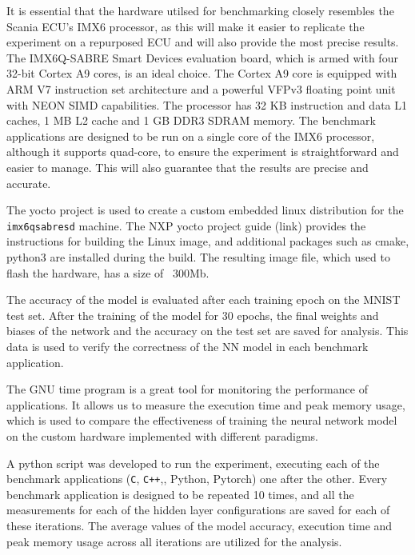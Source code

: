 It is essential that the hardware utilsed for benchmarking closely resembles the Scania ECU's IMX6 processor, as this will make it easier to replicate the experiment on a repurposed ECU and will also provide the most precise results. The IMX6Q-SABRE Smart Devices evaluation board, which is armed with four 32-bit Cortex A9 cores, is an ideal choice. The Cortex A9 core is equipped with ARM V7 instruction set architecture and a powerful VFPv3 floating point unit with NEON SIMD capabilities. The processor has 32 KB instruction and data L1 caches, 1 MB L2 cache and 1 GB DDR3 SDRAM memory. The benchmark applications are designed to be run on a single core of the IMX6 processor, although it supports quad-core, to ensure the experiment is straightforward and easier to manage. This will also guarantee that the results are precise and accurate.

The yocto project is used to create a custom embedded linux distribution for the \texttt{imx6qsabresd} machine. The NXP yocto project guide (link) provides the instructions for building the Linux image, and additional packages such as cmake, python3 are installed during the build. The resulting image file, which used to flash the hardware, has a size of ~300Mb.

The accuracy of the model is evaluated after each training epoch on the MNIST test set. After the training of the model for 30 epochs, the final weights and biases of the network and the accuracy on the test set are saved for analysis. This data is used to verify the correctness of the NN model in each benchmark application.

The GNU time program is a great tool for monitoring the performance of applications. It allows us to measure the execution time and peak memory usage, which is used to compare the effectiveness of training the neural network model on the custom hardware implemented with different paradigms.

A python script was developed to run the experiment, executing each of the benchmark applications (\texttt{C}, \texttt{C++},, Python, Pytorch) one after the other. Every benchmark application is designed to be repeated 10 times, and all the measurements for each of the hidden layer configurations are saved for each of these iterations. The average values of the model accuracy, execution time and peak memory usage across all iterations are utilized for the analysis.


